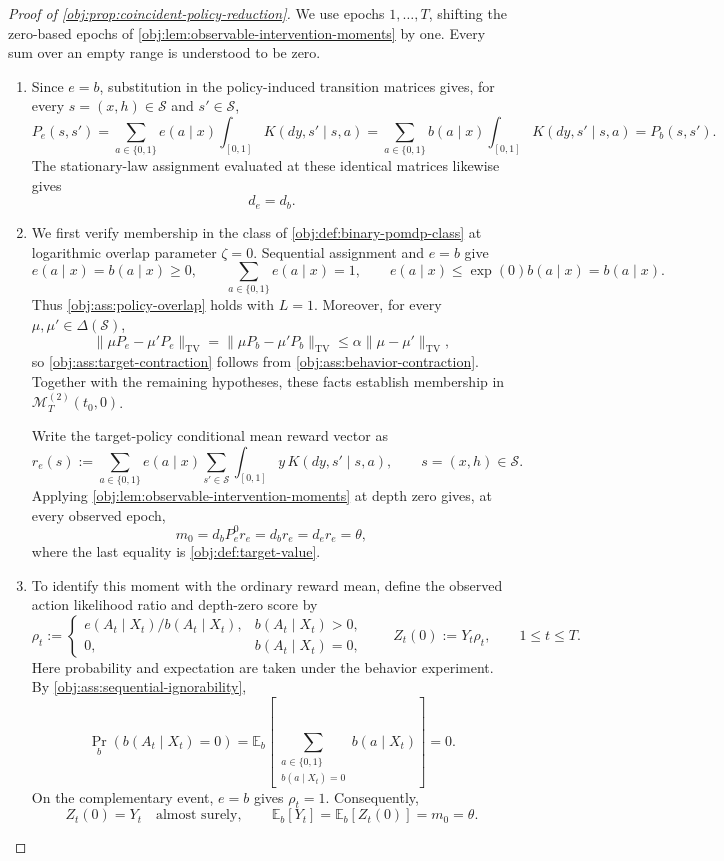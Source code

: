 \documentclass[11pt]{article}
\begin{document}
\begin{proof}[Proof of \cref{obj:prop:coincident-policy-reduction}]
We use epochs \(1,\ldots,T\), shifting the zero-based epochs of \cref{obj:lem:observable-intervention-moments} by one. Every sum over an empty range is understood to be zero.

\begin{enumerate}
\item Since \(e=b\), substitution in the policy-induced transition matrices gives, for every \(s=(x,h)\in\mathcal S\) and \(s'\in\mathcal S\),
\[
P_e(s,s')
=
\sum_{a\in\{0,1\}}e(a\mid x)
   \int_{[0,1]}K(dy,s'\mid s,a)
=
\sum_{a\in\{0,1\}}b(a\mid x)
   \int_{[0,1]}K(dy,s'\mid s,a)
=
P_b(s,s').
\]
The stationary-law assignment evaluated at these identical matrices likewise gives
\[
d_e=d_b.
\]

\item We first verify membership in the class of \cref{obj:def:binary-pomdp-class} at logarithmic overlap parameter \(\zeta=0\). Sequential assignment and \(e=b\) give
\[
e(a\mid x)=b(a\mid x)\geq0,
\qquad
\sum_{a\in\{0,1\}}e(a\mid x)=1,
\qquad
e(a\mid x)\leq \exp(0)b(a\mid x)=b(a\mid x).
\]
Thus \cref{obj:ass:policy-overlap} holds with \(L=1\). Moreover, for every \(\mu,\mu'\in\Delta(\mathcal S)\),
\[
\|\mu P_e-\mu'P_e\|_{\mathrm{TV}}
=
\|\mu P_b-\mu'P_b\|_{\mathrm{TV}}
\leq
\alpha\|\mu-\mu'\|_{\mathrm{TV}},
\]
so \cref{obj:ass:target-contraction} follows from \cref{obj:ass:behavior-contraction}. Together with the remaining hypotheses, these facts establish membership in \(\mathcal M_T^{(2)}(t_0,0)\).

Write the target-policy conditional mean reward vector as
\[
r_e(s):=
\sum_{a\in\{0,1\}}e(a\mid x)
\sum_{s'\in\mathcal S}\int_{[0,1]}y\,K(dy,s'\mid s,a),
\qquad s=(x,h)\in\mathcal S.
\]
Applying \cref{obj:lem:observable-intervention-moments} at depth zero gives, at every observed epoch,
\[
m_0=d_bP_e^0r_e=d_br_e=d_er_e=\theta,
\]
where the last equality is \cref{obj:def:target-value}.

\item To identify this moment with the ordinary reward mean, define the observed action likelihood ratio and depth-zero score by
\[
\rho_t:=
\begin{cases}
e(A_t\mid X_t)/b(A_t\mid X_t),& b(A_t\mid X_t)>0,\\
0,& b(A_t\mid X_t)=0,
\end{cases}
\qquad
Z_t(0):=Y_t\rho_t,
\qquad 1\leq t\leq T.
\]
Here probability and expectation are taken under the behavior experiment. By \cref{obj:ass:sequential-ignorability},
\[
\Pr_b\!\left(b(A_t\mid X_t)=0\right)
=
\mathbb E_b\!\left[
\sum_{\substack{a\in\{0,1\}\\ b(a\mid X_t)=0}}
b(a\mid X_t)
\right]
=0.
\]
On the complementary event, \(e=b\) gives \(\rho_t=1\). Consequently,
\[
Z_t(0)=Y_t\quad\text{almost surely},
\qquad
\mathbb E_b[Y_t]
=
\mathbb E_b[Z_t(0)]
=
m_0
=
\theta.
\]


\end{enumerate}
\end{proof}
\end{document}
